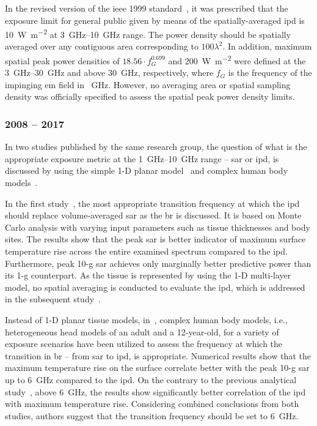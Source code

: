 In the revised version of the \gls{ieee} 1999 standard~\cite{IEEE1999Standard}, it was prescribed that the exposure limit for general public given by means of the spatially-averaged \gls{ipd} is \SI{10}{\W\per\m\squared} at \SIrange[range-units=single,range-phrase=--]{3}{10}{\GHz} range.
The power density should be spatially averaged over any contiguous area corresponding to $100 \lambda^2$.
In addition, maximum spatial peak power densities of $18.56 \cdot f_G^{0.699}$
and \SI{200}{\watt\per\m\squared} were defined at the \SIrange[range-units=single,range-phrase=--]{3}{30}{\GHz} 
and above \SI{30}{\GHz}, respectively, where $f_G$ is the frequency of the impinging \gls{em} field in \SI{}{\GHz}.
However, no averaging area or spatial sampling density was officially specified to assess the spatial peak power density limits.

\subsubsection*{2008 -- 2017}
In two studies published by the same research group, the question of what is the appropriate exposure metric at the \SIrange[range-units=single,range-phrase=--]{1}{10}{\GHz} range -- \gls{sar} or \gls{ipd}, is discussed by using the simple 1-D planar model~\cite{Anderson2010SAR} and complex human body models~\cite{McIntosh2010SAR}.

In the first study~\cite{Anderson2010SAR}, the most appropriate transition frequency at which the \gls{ipd} should replace volume-averaged \gls{sar} as the \gls{br} is discussed.
It is based on Monte Carlo analysis with varying input parameters such as tissue thicknesses and body sites.
The results show that the peak \gls{sar} is better indicator of maximum surface temperature rise across the entire examined spectrum compared to the \gls{ipd}.
Furthermore, peak 10-g \gls{sar} achieves only marginally better predictive power than its 1-g counterpart.
As the tissue is represented by using the 1-D multi-layer model, no spatial averaging is conducted to evaluate the \gls{ipd}, which is addressed in the subsequent study~\cite{McIntosh2010SAR}.

Instead of 1-D planar tissue models, in~\cite{McIntosh2010SAR}, complex human body models, i.e., heterogeneous head models of an adult and a 12-year-old, for a variety of exposure scenarios have been utilized to assess the frequency at which the transition in \gls{br} -- from \gls{sar} to \gls{ipd}, is appropriate.
Numerical results show that the maximum temperature rise on the surface correlate better with the peak 10-g \gls{sar} up to \SI{6}{\GHz} compared to the \gls{ipd}.
On the contrary to the previous analytical study~\cite{Anderson2010SAR}, above \SI{6}{\GHz}, the results show significantly better correlation of the \gls{ipd} with maximum temperature rise.
Considering combined conclusions from both studies, authors suggest that the transition frequency should be set to \SI{6}{\GHz}.

